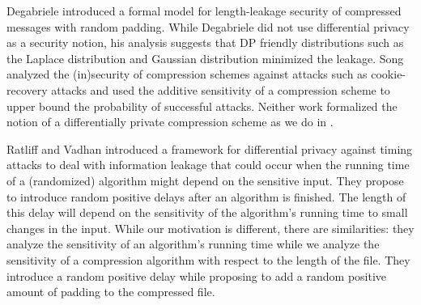 Degabriele \cite{CCS:Degabriele21} introduced a formal model for length-leakage security of compressed messages with random padding. While Degabriele \cite{CCS:Degabriele21} did not use differential privacy as a security notion, his analysis suggests that DP friendly distributions such as the  Laplace distribution and Gaussian distribution minimized the leakage. Song \cite{song2024refined} analyzed the (in)security of compression schemes against attacks such as cookie-recovery attacks and used the additive sensitivity of a compression scheme to upper bound the probability of successful attacks. Neither work \cite{CCS:Degabriele21,song2024refined} formalized the notion of a differentially private compression scheme as we do in .  


Ratliff and Vadhan introduced a framework for differential privacy against timing attacks \cite{ratliff2024framework} to deal with information leakage that could occur when the running time of a (randomized) algorithm might depend on the sensitive input. They propose to introduce random positive delays after an algorithm is finished. The length of this delay will depend on the sensitivity of the algorithm's running time to small changes in the input. While our motivation is different, there are similarities: they analyze the sensitivity of an algorithm's running time while we analyze the sensitivity of a compression algorithm with respect to the length of the file. They introduce a random positive delay while proposing to add a random positive amount of padding to the compressed file. 






